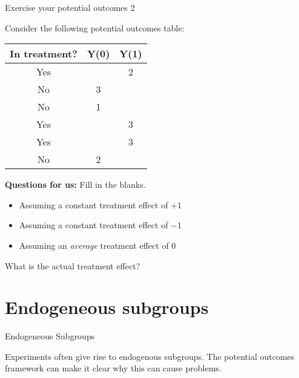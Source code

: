 \documentclass[11pt,ignorenonframetext,]{beamer}
\begin{document}
\begin{frame}{Exercise your potential outcomes 2}

Consider the following potential outcomes table:

\begin{table} \centering

    \begin{tabular}{c|c|c}
        In treatment?   &Y(0)   &Y(1)  \\ \hline
        Yes &   & 2 \\
        No  & 3 &   \\
        No  & 1 &   \\
        Yes &   & 3 \\
        Yes &   & 3 \\
        No  & 2 &   
    \end{tabular} 
\end{table}

\color{red}\textbf{Questions for us: } Fill in the blanks.

\begin{itemize}
    \item Assuming a constant treatment effect of $+1$ 
    \item Assuming a constant treatment effect of $-1$ 
    \item Assuming an \textit{average} treatment effect of $0$
\end{itemize}

\color{red} What is the actual treatment effect?

\end{frame}

\section{Endogeneous subgroups}\label{endogeneous-subgroups}

\begin{frame}{Endogeneous Subgroups}

Experiments often give rise to endogenous subgroups. The potential
outcomes framework can make it clear why this can cause problems.

\end{frame}
\end{document}

